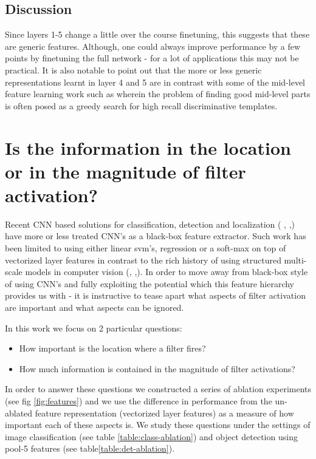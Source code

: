 \documentclass[runningheads]{llncs}
\begin{document}
\subsection{Discussion}
\label{sub:fine-discussion}
Since layers 1-5 change a little over the course finetuning, this suggests that these are generic features. Although, one could always improve performance by a few points by finetuning the full network - for a lot of applications this may not be practical. 
It is also notable to point out that the more or less generic representations learnt in layer 4 and 5 are in contrast with some of the mid-level feature learning work such as \cite{Blocks} \cite{Mid1} wherein the problem of finding good mid-level parts is often posed as a greedy search for high recall discriminative templates.


\section{Is the information in the location or in the magnitude of filter activation?}
\label{sec-where-info}
Recent CNN based solutions for  classification, detection and localization ( \cite{overfeat}, \cite{Decaf},\cite{Rcnn}) have more or less treated CNN's as a black-box feature extractor. Such work has been limited to using either linear svm's, regression or a soft-max on top of vectorized layer features in contrast to the rich history of using structured multi-scale models in computer vision (\cite{DPM}, \cite{YangRamanan},\cite{Poselets}). In order to move away from black-box style of using CNN's and fully exploiting the potential which this feature hierarchy provides us with - it is instructive to tease apart what aspects of filter activation are important and what aspects can be ignored. 

In this work we focus on 2 particular questions:
\begin{itemize}
\item How important is the location where a filter fires?
\item How much information is contained in the magnitude of filter activations?
\end{itemize}

In order to answer these questions we constructed a series of ablation experiments (see fig \ref{fig:features}) and we use the difference in performance from the un-ablated feature representation (vectorized layer features) as a measure of how important each of these aspects is. We study these questions under the  settings of image classification (see table \ref{table:class-ablation}) and object detection using pool-5 features (see table\ref{table:det-ablation}). 
\end{document}
